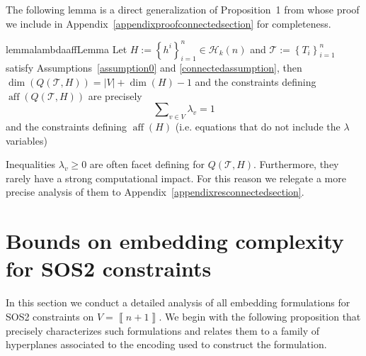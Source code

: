 \documentclass[mnsc]{informs3}
\newcommand{\set}[1]{\left\{#1\right\}}                     %
\newcommand{\abs}[1]{\left|#1\right|}                       %
\newcommand{\bra}[1]{\left(#1\right)}
\newcommand{\sidx}[1]{\left\llbracket     #1 \right\rrbracket}
\DeclareMathOperator{\aff}{aff}
\begin{document}
The following lemma is a direct generalization of Proposition~1 from \cite{lee01} whose proof we include in  Appendix~\ref{appendixproofconnectedsection} for completeness.


\begin{restatable}{lemma}{lambdaaffLemma}\label{lambdaaff} Let $H:=\set{h^i}_{i=1}^n\in \mathcal{H}_k(n)$ and $\mathcal{T}:=\set{T_i}_{i=1}^n$ satisfy Assumptions~\ref{assumption0} and \ref{connectedassumption}, then $\dim\bra{Q\bra{\mathcal{T},H}}=\abs{V}+\dim\bra{H}-1$ and the constraints defining $\aff\bra{Q\bra{\mathcal{T},H}}$ are precisely  
\begin{equation}\label{simplexequality}
\sum\nolimits_{v\in V}\lambda_v=1 
\end{equation}
and the constraints defining $\aff\bra{H}$ (i.e. equations that do not include the $\lambda$ variables)
\end{restatable}

Inequalities $\lambda_v\geq 0$ are often facet defining for $Q\bra{\mathcal{T},H}$. Furthermore, they rarely have a strong computational impact. For this reason we relegate a more precise analysis of them to Appendix~\ref{appendixresconnectedsection}.

\section{Bounds on embedding complexity for SOS2 constraints}\label{SOS2}
In this section we conduct a detailed analysis of all embedding formulations for SOS2 constraints on $V=\sidx{n+1}$. We begin with the following proposition that precisely characterizes such formulations and relates them to a family of hyperplanes associated to the encoding used to construct the formulation.
\end{document}
